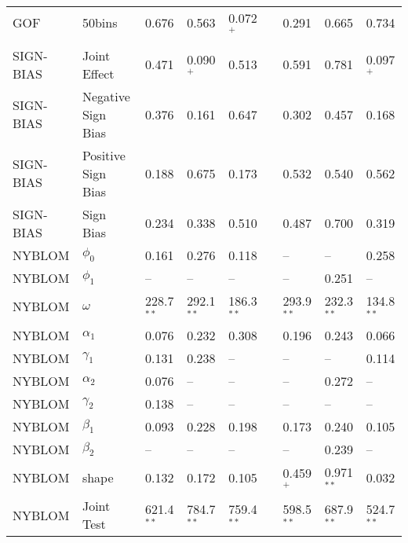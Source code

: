 \begin{table}
\begin{threeparttable}
\begin{tabular}[c]{l l l l l c l l l}
		  GOF &             50bins & 0.676 & 0.563       & 0.072$^{+}$ & & 0.291       & 0.665       & 0.734       \\ \\
	SIGN-BIAS &       Joint Effect & 0.471 & 0.090$^{+}$ & 0.513       & & 0.591       & 0.781       & 0.097$^{+}$ \\
	SIGN-BIAS & Negative Sign Bias & 0.376 & 0.161       & 0.647       & & 0.302       & 0.457       & 0.168       \\
	SIGN-BIAS & Positive Sign Bias & 0.188 & 0.675       & 0.173       & & 0.532       & 0.540       & 0.562       \\
	SIGN-BIAS &          Sign Bias & 0.234 & 0.338       & 0.510       & & 0.487       & 0.700       & 0.319       \\
	\midrule
	   NYBLOM &         $\phi_{0}$ & 0.161        & 0.276        & 0.118        & &    --        &      --        &   0.258        \\
	   NYBLOM &         $\phi_{1}$ &    --        &    --        &    --        & &    --        &   0.251        &      --        \\
	   NYBLOM &         $\omega$   & 228.7$^{**}$ & 292.1$^{**}$ & 186.3$^{**}$ & & 293.9$^{**}$ &   232.3$^{**}$ &   134.8$^{**}$ \\
	   NYBLOM &       $\alpha_{1}$ & 0.076        & 0.232        & 0.308        & & 0.196        &   0.243        &   0.066        \\
	   NYBLOM &       $\gamma_{1}$ & 0.131        & 0.238        &    --        & &    --        &      --        &   0.114        \\
	   NYBLOM &       $\alpha_{2}$ & 0.076        &    --        &    --        & &    --        &   0.272        &      --        \\
	   NYBLOM &       $\gamma_{2}$ & 0.138        &    --        &    --        & &    --        &      --        &      --        \\
	   NYBLOM &        $\beta_{1}$ & 0.093        & 0.228        & 0.198        & & 0.173        &   0.240        &   0.105        \\
	   NYBLOM &        $\beta_{2}$ &    --        &    --        &    --        & &    --        &   0.239        &      --        \\
	   NYBLOM &              shape & 0.132        & 0.172        & 0.105        & & 0.459$^{+}$  &   0.971$^{**}$ &   0.032        \\
	   NYBLOM &         Joint Test & 621.4$^{**}$ & 784.7$^{**}$ & 759.4$^{**}$ & & 598.5$^{**}$ &   687.9$^{**}$ &   524.7$^{**}$ \\		 

\end{tabular}
\end{threeparttable}
\end{table}

